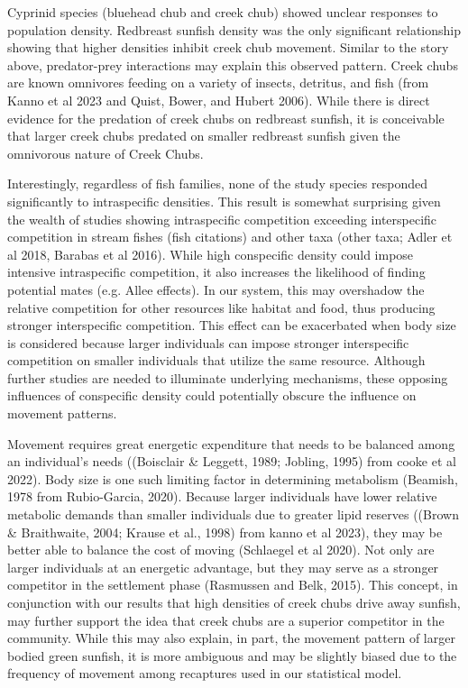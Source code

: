\documentclass[11pt, class=article, crop=false]{standalone}
\begin{document}
Cyprinid species (bluehead chub and creek chub) showed unclear responses to population density. Redbreast sunfish density was the only significant relationship showing that higher densities inhibit creek chub movement. Similar to the story above, predator-prey interactions may explain this observed pattern. Creek chubs are known omnivores feeding on a variety of insects, detritus, and fish (from Kanno et al 2023 and Quist, Bower, and Hubert 2006). While there is direct evidence for the predation of creek chubs on redbreast sunfish, it is conceivable that larger creek chubs predated on smaller redbreast sunfish given the omnivorous nature of Creek Chubs.

Interestingly, regardless of fish families, none of the study species responded significantly to intraspecific densities. This result is somewhat surprising given the wealth of studies showing intraspecific competition exceeding interspecific competition in stream fishes (fish citations) and other taxa (other taxa; Adler et al 2018, Barabas et al 2016). While high conspecific density could impose intensive intraspecific competition, it also increases the likelihood of finding potential mates (e.g. Allee effects). In our system, this may overshadow the relative competition for other resources like habitat and food, thus producing stronger interspecific competition. This effect can be exacerbated when body size is considered because larger individuals can impose stronger interspecific competition on smaller individuals that utilize the same resource. Although further studies are needed to illuminate underlying mechanisms, these opposing influences of conspecific density could potentially obscure the influence on movement patterns. 

Movement requires great energetic expenditure that needs to be balanced among an individual’s needs ((Boisclair & Leggett, 1989; Jobling, 1995) from cooke et al 2022). Body size is one such limiting factor in determining metabolism (Beamish, 1978 from Rubio-Garcia, 2020). Because larger individuals have lower relative metabolic demands than smaller individuals due to greater lipid reserves ((Brown & Braithwaite, 2004; Krause et al., 1998) from kanno et al 2023), they may be better able to balance the cost of moving (Schlaegel et al 2020). Not only are larger individuals at an energetic advantage, but they may serve as a stronger competitor in the settlement phase (Rasmussen and Belk, 2015). This concept, in conjunction with our results that high densities of creek chubs drive away sunfish, may further support the idea that creek chubs are a superior competitor in the community. While this may also explain, in part, the movement pattern of larger bodied green sunfish, it is more ambiguous and may be slightly biased due to the frequency of movement among recaptures used in our statistical model. 
\end{document}
